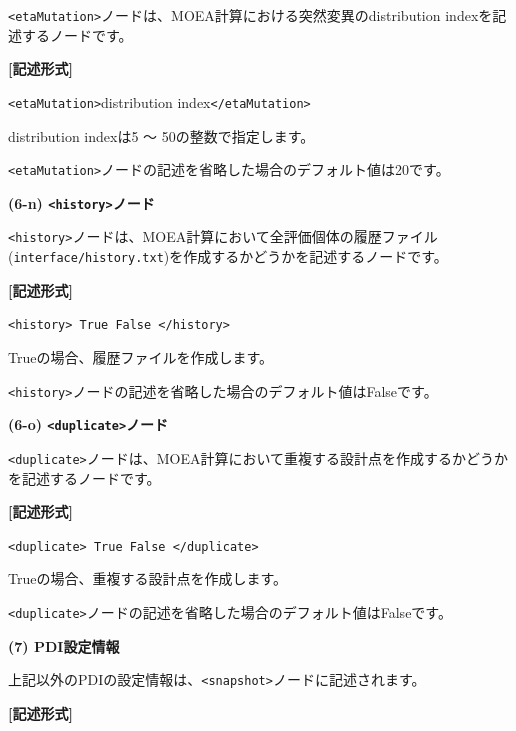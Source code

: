 \documentclass[a4paper,11pt]{jarticle}
\begin{document}
{\texttt{<etaMutation>}ノードは、MOEA計算における突然変異のdistribution indexを記述するノードです。

\vspace{8pt}
\leftskip=12pt
\textbf{[記述形式]}

\leftskip=42pt
\texttt{<etaMutation>}distribution index\texttt{</etaMutation>}

\vspace{8pt}
\leftskip=0pt
distribution indexは5 〜 50の整数で指定します。

\texttt{<etaMutation>}ノードの記述を省略した場合のデフォルト値は20です。

\vspace{12pt}
\textbf{(6-n) \texttt{<history>}ノード}

\texttt{<history>}ノードは、MOEA計算において全評価個体の履歴ファイル({\tt interface/history.txt})を作成するかどうかを記述するノードです。

\vspace{8pt}
\leftskip=12pt
\textbf{[記述形式]}

\leftskip=42pt
\texttt{<history> True \textbar{} False </history>}

\vspace{8pt}
\leftskip=0pt
Trueの場合、履歴ファイルを作成します。

\texttt{<history>}ノードの記述を省略した場合のデフォルト値はFalseです。

\vspace{12pt}
\textbf{(6-o) \texttt{<duplicate>}ノード}

\texttt{<duplicate>}ノードは、MOEA計算において重複する設計点を作成するかどうかを記述するノードです。

\vspace{8pt}
\leftskip=12pt
\textbf{[記述形式]}

\leftskip=42pt
\texttt{<duplicate> True \textbar{} False </duplicate>}

\vspace{8pt}
\leftskip=0pt
Trueの場合、重複する設計点を作成します。

\texttt{<duplicate>}ノードの記述を省略した場合のデフォルト値はFalseです。


\vspace{12pt}
\textbf{(7) PDI設定情報}

上記以外のPDIの設定情報は、\texttt{<snapshot>}ノードに記述されます。

\vspace{8pt}
\leftskip=12pt
\textbf{[記述形式]}

}
\end{document}
